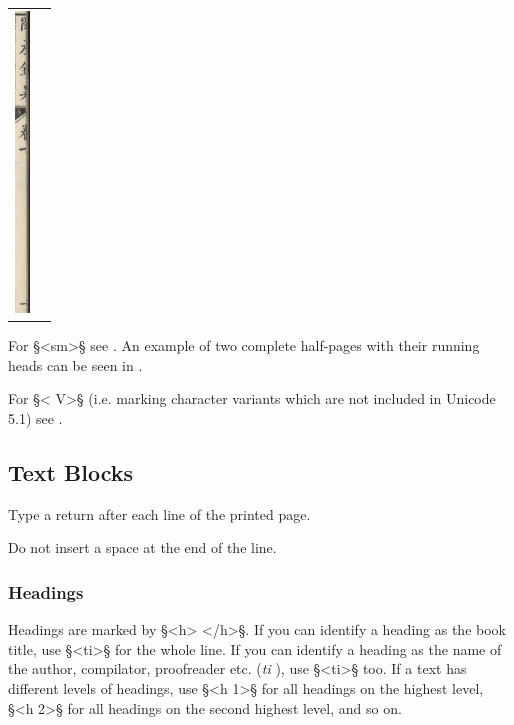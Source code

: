 \documentclass[fontsize=11pt, paper=a4, 
DIV15,
headings=normal,
parskip=half-, 
numbers=noenddot]{scrartcl}
\newcommand{\chin}[1]{{\fontspec{Sun-ExtA}{#1}}}
\newcommand{\z}[1]{\chin{#1}} %
\begin{document}
\begin{tabular}{@{}ll}
\includegraphics[height=8cm]{chinese_rh_3b}
\end{tabular}

\vspace{3mm}
\begin{crossref}
For §<sm>§ see . An example of two complete half-pages with their running heads can be seen in .
\end{crossref}

\begin{note}
For §< V>§ (i.e. marking character variants which are not included in Unicode 5.1) see . 
\end{note}


\tocspace
\subsection{Text Blocks}

\begin{mainrule}
Type a return after each line of the printed page.
\end{mainrule}

\begin{clarification}
Do not insert a space at the end of the line. 
\end{clarification}



\subsubsection{Headings}
\label{section chinese headings}

\begin{mainrule}
Headings are marked by §<h> </h>§. If you can identify a heading as the book title, use §<ti>§ for the whole line. If you can identify a heading as the name of the author, compilator, proofreader etc. (\emph{ti} \z{題}), use §<ti>§ too. If a text has different levels of headings, use §<h 1>§ for all headings on the highest level, §<h 2>§ for all headings on the second highest level, and so on.
\end{mainrule}
\end{document}
